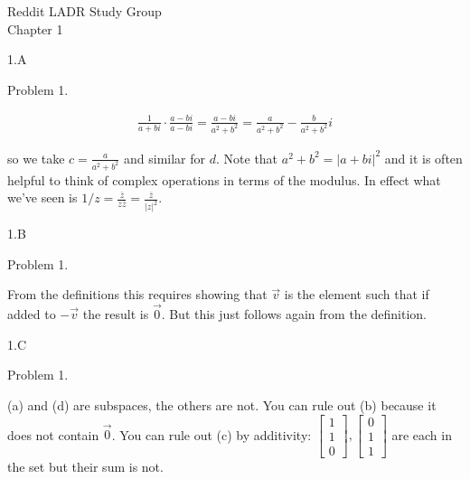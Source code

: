 \documentclass[11pt]{article} %
\begin{document}
\begin{center}
\LARGE Reddit LADR Study Group \\
Chapter 1
\end{center}

{\Large 1.A}

{\large Problem 1. }

\begin{align*}
	\frac{1}{a+bi}\cdot \frac{a-bi}{a-bi} = \frac{a-bi}{a^2+b^2} = \frac{a}{a^2+b^2}-\frac{b}{a^2+b^2}i
\end{align*}

so we take $c= \frac{a}{a^2+b^2}$ and similar for $d$.  Note that $a^2+b^2 = |a+bi|^2$ and it is often helpful to think of complex operations in terms of the modulus.  In effect what we've seen is $1/z = \frac{\overline{z}}{z\overline{z}} = \frac{\overline{z}}{|z|^2}$.

\pagebreak

{\Large 1.B}

{\large Problem 1.}

From the definitions this requires showing that $\vec v$ is the element such that if added to $-\vec v$ the result is $\vec 0$.  But this just follows again from the definition.

\pagebreak

{\Large 1.C}

{\large Problem 1.}

(a) and (d) are subspaces, the others are not.  You can rule out (b) because it does not contain $\vec 0$.  You can rule out (c) by additivity: $\begin{bmatrix} 1\\1\\0\end{bmatrix}, \begin{bmatrix}0\\1\\1\end{bmatrix}$ are each in the set but their sum is not.
\end{document}
